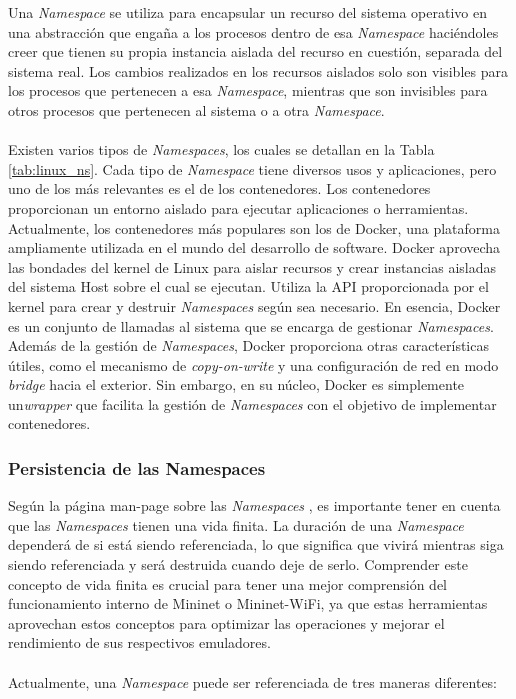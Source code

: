 Una \textit{Namespace} se utiliza para encapsular un recurso del sistema operativo en una abstracción que engaña a los procesos dentro de esa \textit{Namespace} haciéndoles creer que tienen su propia instancia aislada del recurso en cuestión, separada del sistema real. Los cambios realizados en los recursos aislados solo son visibles para los procesos que pertenecen a esa \textit{Namespace}, mientras que son invisibles para otros procesos que pertenecen al sistema o a otra \textit{Namespace}.\\
\\
Existen varios tipos de \textit{Namespaces}, los cuales se detallan en la Tabla \ref{tab:linux_ns}. Cada tipo de \textit{Namespace} tiene diversos usos y aplicaciones, pero uno de los más relevantes es el de los contenedores. Los contenedores proporcionan un entorno aislado para ejecutar aplicaciones o herramientas. Actualmente, los contenedores más populares son los de Docker, una plataforma ampliamente utilizada en el mundo del desarrollo de software. Docker aprovecha las bondades del kernel de Linux para aislar recursos y crear instancias aisladas del sistema Host sobre el cual se ejecutan. Utiliza la API proporcionada por el kernel para crear y destruir \textit{Namespaces} según sea necesario. En esencia, Docker es un conjunto de llamadas al sistema que se encarga de gestionar \textit{Namespaces}. Además de la gestión de \textit{Namespaces}, Docker proporciona otras características útiles, como el mecanismo de \textit{copy-on-write} y una configuración de red en modo \textit{bridge} hacia el exterior. Sin embargo, en su núcleo, Docker es simplemente un\textit{wrapper} que facilita la gestión de \textit{Namespaces} con el objetivo de implementar contenedores.



\subsubsection{Persistencia de las Namespaces}


Según la página man-page sobre las \textit{Namespaces} \cite{ns}, es importante tener en cuenta que las \textit{Namespaces} tienen una vida finita. La duración de una \textit{Namespace} dependerá de si está siendo referenciada, lo que significa que vivirá mientras siga siendo referenciada y será destruida cuando deje de serlo. Comprender este concepto de vida finita es crucial para tener una mejor comprensión del funcionamiento interno de Mininet o Mininet-WiFi, ya que estas herramientas aprovechan estos conceptos para optimizar las operaciones y mejorar el rendimiento de sus respectivos emuladores.\\
\\
Actualmente, una \textit{Namespace} puede ser referenciada de tres maneras diferentes:

